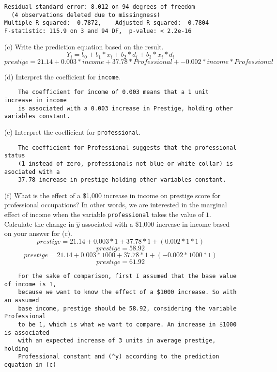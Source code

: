 \documentclass[12pt,letterpaper]{article}
\begin{document}
\begin{enumerate}
\begin{verbatim}
Residual standard error: 8.012 on 94 degrees of freedom
  (4 observations deleted due to missingness)
Multiple R-squared:  0.7872,	Adjusted R-squared:  0.7804 
F-statistic: 115.9 on 3 and 94 DF,  p-value: < 2.2e-16
\end{verbatim}
	\item [(c)]
	Write the prediction equation based on the result.
\begin{equation}
Y_i = b_0 + b_1*x_i +b_2*d_i + b_3*x_i*d_i
\end{equation}
\begin{equation}
prestige = 21.14 + 0.003*income+ 37.78*Professional + -0.002*income*Professional
\end{equation}	
	
\newpage
	\item [(d)]
	Interpret the coefficient for \texttt{income}.
\begin{verbatim}
	The coefficient for income of 0.003 means that a 1 unit increase in income
	is associated with a 0.003 increase in Prestige, holding other variables constant.
\end{verbatim}
	\item [(e)]
	Interpret the coefficient for \texttt{professional}.
\begin{verbatim}
	The coefficient for Professional suggests that the professional status 
	(1 instead of zero, professionals not blue or white collar) is asociated with a 
	37.78 increase in prestige holding other variables constant.
\end{verbatim}
	
	\newpage
	\item [(f)]
	What is the effect of a \$1,000 increase in income on prestige score for professional occupations? In other words, we are interested in the marginal effect of income when the variable \texttt{professional} takes the value of $1$. Calculate the change in $\hat{y}$ associated with a \$1,000 increase in income based on your answer for (c).
\begin{equation}
	prestige = 21.14 + 0.003*1 + 37.78*1 + (0.002*1*1)
\end{equation}
\begin{equation}
	prestige = 58.92
\end{equation}
\begin{equation}
	prestige = 21.14 + 0.003*1000 +37.78*1 + (-0.002*1000*1)
\end{equation}
\begin{equation}
	prestige = 61.92
\end{equation}
\begin{verbatim}
	For the sake of comparison, first I assumed that the base value of income is 1,
	because we want to know the effect of a $1000 increase. So with an assumed
	base income, prestige should be 58.92, considering the variable Professional
	to be 1, which is what we want to compare. An increase in $1000 is associated
	with an expected increase of 3 units in average prestige, holding
	Professional constant and (^y) according to the prediction equation in (c)
\end{verbatim}	
	

\end{enumerate}
\end{document}
